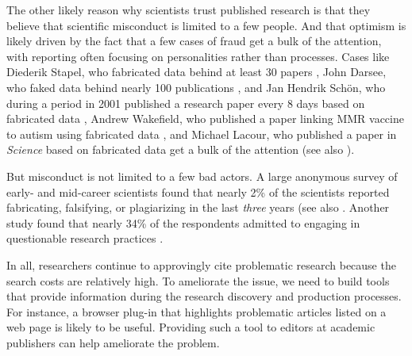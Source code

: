 \documentclass[12pt]{article}
\begin{document}
The other likely reason why scientists trust published research is that they believe that scientific misconduct is limited to a few people. And that optimism is likely driven by the fact that a few cases of fraud get a bulk of the attention, with reporting often focusing on personalities rather than processes. Cases like Diederik Stapel, who fabricated data behind at least 30 papers \cite{levelt2012flawed}, John Darsee, who faked data behind nearly 100 publications \cite{stewart1987integrity, anderson2013research, wallis1983fraud}, and Jan Hendrik Sch{\"o}n, who during a period in 2001 published a research paper every 8 days based on fabricated data \cite{service2003scientific, anderson2013research}, Andrew Wakefield, who published a paper linking MMR vaccine to autism using fabricated data \cite{wakefield1998retracted, deer2011case, godlee2011wakefield}, and Michael Lacour, who published a paper in \textit{Science} based on fabricated data \cite{broockman2015irregularities, mcnutt2015editorial} get a bulk of the attention (see also \cite{basu2006they, anderson2013research}).

But misconduct is not limited to a few bad actors. A large anonymous survey of early- and mid-career scientists found that nearly 2\% of the scientists reported fabricating, falsifying, or plagiarizing in the last \textit{three} years \cite{martinson2005scientists} (see also \cite{titus2008repairing}. Another study found that nearly 34\% of the respondents admitted to engaging in questionable research practices \cite{fanelli2009many}.

In all, researchers continue to approvingly cite problematic research because the search costs are relatively high. To ameliorate the issue, we need to build tools that provide information during the research discovery and production processes. For instance, a browser plug-in that highlights problematic articles listed on a web page is likely to be useful. Providing such a tool to editors at academic publishers can help ameliorate the problem.
\end{document}
